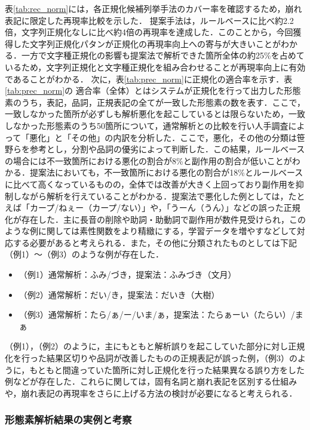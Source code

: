 \documentclass[japanese]{jnlp_1.4}
\begin{document}
表\ref{tab:rec_norm}には，各正規化候補列挙手法のカバー率を確認するため，崩れ表記に限定した再現率比較を示した．
提案手法は，ルールベースに比べ約2.2倍，文字列正規化なしに比べ約4倍の再現率を達成した．このことから，今回獲得した文字列正規化パタンが正規化の再現率向上への寄与が大きいことがわかる．一方で文字種正規化の影響も提案法で解析できた箇所全体の約25\%を占めているため，文字列正規化と文字種正規化を組み合わせることが再現率向上に有効であることがわかる．
次に，表\ref{tab:prec_norm}に正規化の適合率を示す．表\ref{tab:prec_norm}の
適合率（全体）とはシステムが正規化を行って出力した形態素のうち，表記，品詞，正規表記の全てが一致した形態素の数を表す．ここで，一致しなかった箇所が必ずしも解析悪化を起こしているとは限らないため，一致しなかった形態素のうち50箇所について，通常解析との比較を行い人手調査によって「悪化」と「その他」の内訳を分析した．ここで，悪化，その他の分類は笹野ら\cite{sasano2014}を参考とし，分割や品詞の優劣によって判断した．この結果，ルールベースの場合には不一致箇所における悪化の割合が8\%と副作用の割合が低いことがわかる．提案法においても，不一致箇所における悪化の割合が18\%とルールベースに比べて高くなっているものの，全体では改善が大きく上回っており副作用を抑制しながら解析を行えていることがわかる．提案法で悪化した例としては，たとえば「カープ/ねぇー（カープ/ない）」や，「うーん（うん）」などの誤った正規化が存在した．主に長音の削除や助詞・助動詞で副作用が数件見受けられ，このような例に関しては素性関数をより精緻にする，学習データを増やすなどして対応する必要があると考えられる．また，その他に分類されたものとしては下記（例1）〜（例3）のような例が存在した．

\begin{itemize}
  \item （例1）通常解析：ふみ/づき，提案法：ふみづき（文月）
\item （例2）通常解析：だい/き，提案法：だいき（大樹）
  \item （例3）通常解析：たら/ぁ/ー/いま/ぁ，提案法：たらぁーい（たらい）/まぁ
\end{itemize}
（例1），（例2）のように，主にもともと解析誤りを起こしていた部分に対し正規化を行った結果区切りや品詞が改善したものの正規表記が誤った例，（例3）のように，もともと間違っていた箇所に対し正規化を行った結果異なる誤り方をした例などが存在した．これらに関しては，固有名詞と崩れ表記を区別する仕組みや，崩れ表記の再現率をさらに上げる方法の検討が必要になると考えられる．


\subsubsection{形態素解析結果の実例と考察}
\end{document}
